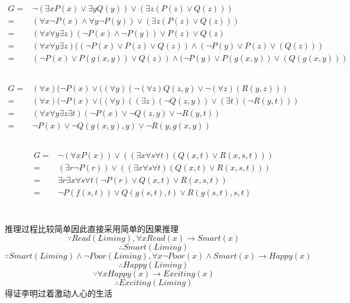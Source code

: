 \documentclass[UTF8,a4paper]{paper}
\begin{document}
\section{}
\subsection{}
\begin{equation}\begin{aligned}
G=&\neg(\exists xP(x)\lor\exists yQ(y))\lor(\exists z(P(z)\lor Q(z)))\\
=&(\forall x\neg P(x) \land\forall y\neg P(y))\lor(\exists z(P(z)\lor Q(z)))\\
=&(\forall x\forall y\exists z)(\neg P(x) \land\neg P(y))\lor P(z)\lor Q(z)\\
=&(\forall x\forall y\exists z)((\neg P(x)\lor P(z)\lor Q(z))\land(\neg P(y)\lor P(z)\lor(Q(z)))\\
=&(\neg P(x)\lor P(g(x,y))\lor Q(z))\land(\neg P(y)\lor P(g(x,y))\lor(Q(g(x,y)))
\end{aligned}\end{equation}
\subsection{}
\begin{equation}\begin{aligned}
G=&(\forall x)(\neg P(x)\lor((\forall y)(\neg(\forall z)Q(z,y)\lor\neg(\forall z)(R(y,z)))\\
=&(\forall x)(\neg P(x)\lor((\forall y)((\exists z)(\neg Q(z,y))\lor(\exists t)(\neg R(y,t)))\\
=&(\forall x\forall y\exists z\exists t)(\neg P(x)\lor\neg Q(z,y)\lor\neg R(y,t))\\
=&\neg P(x)\lor\neg Q(g(x,y),y)\lor\neg R(y,g(x,y))
\end{aligned}\end{equation}
\subsection{}
\begin{equation}\begin{aligned}
G=&\neg(\forall xP(x))\lor((\exists x\forall s\forall t)(Q(x,t)\lor R(x,s,t)))\\
=&(\exists r\neg P(r))\lor((\exists x\forall s\forall t)(Q(x,t)\lor R(x,s,t)))\\
=&\exists r\exists x\forall s\forall t(\neg P(r)\lor Q(x,t)\lor R(x,s,t))\\
=&\neg P(f(s,t))\lor Q(g(s,t),t)\lor R(g(s,t),s,t)
\end{aligned}\end{equation}
\section{}
推理过程比较简单因此直接采用简单的因果推理
$$\because Read(Liming),\forall x Read(x)\rightarrow Smart(x)$$
$$\therefore Smart(Liming)$$
$$\because Smart(Liming)\land \neg Poor(Liming),\forall x \neg Poor(x)\land Smart(x)\rightarrow Happy(x)$$
$$\therefore Happy(Liming)$$
$$\because \forall x Happy(x)\rightarrow Exciting(x)$$
$$\therefore Exciting(Liming)$$
得证李明过着激动人心的生活
\end{document}
